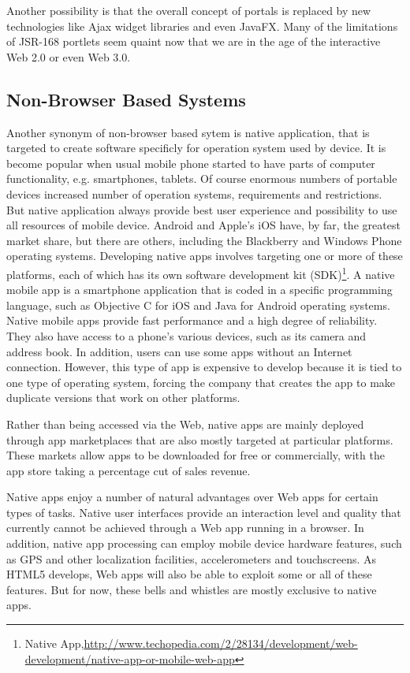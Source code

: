 	Another possibility is that the overall concept of portals is replaced by new technologies like Ajax widget libraries and even JavaFX. Many of the limitations of JSR-168 portlets seem quaint now that we are in the age of the interactive Web 2.0 or even Web 3.0.

\subsection{Non-Browser Based Systems}
Another synonym of non-browser based sytem is native application, that is targeted to create software specificly for operation system used by device. It is become popular when usual mobile phone started to have parts of computer functionality, e.g. smartphones, tablets. Of course enormous numbers of portable devices increased number of operation systems, requirements and restrictions. But native application always provide best user experience and possibility to use all resources of mobile device. Android and Apple's iOS have, by far, the greatest market share, but there are others, including the Blackberry and Windows Phone operating systems. Developing native apps involves targeting one or more of these platforms, each of which has its own software development kit (SDK)\footnote{Native App,\url{http://www.techopedia.com/2/28134/development/web-development/native-app-or-mobile-web-app}}. A native mobile app is a smartphone application that is coded in a specific programming language, such as Objective C for iOS and Java for Android operating systems. Native mobile apps provide fast performance and a high degree of reliability. They also have access to a phone's various devices, such as its camera and address book. In addition, users can use some apps without an Internet connection. However, this type of app is expensive to develop because it is tied to one type of operating system, forcing the company that creates the app to make duplicate versions that work on other platforms.

Rather than being accessed via the Web, native apps are mainly deployed through app marketplaces that are also mostly targeted at particular platforms. These markets allow apps to be downloaded for free or commercially, with the app store taking a percentage cut of sales revenue.

Native apps enjoy a number of natural advantages over Web apps for certain types of tasks. Native user interfaces provide an interaction level and quality that currently cannot be achieved through a Web app running in a browser. In addition, native app processing can employ mobile device hardware features, such as GPS and other localization facilities, accelerometers and touchscreens. As HTML5 develops, Web apps will also be able to exploit some or all of these features. But for now, these bells and whistles are mostly exclusive to native apps.

